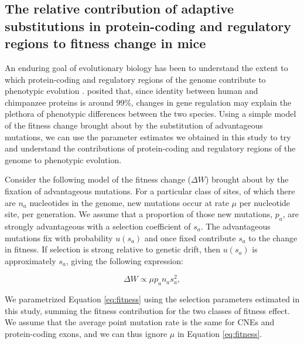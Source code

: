 {\subsection{The relative contribution of adaptive substitutions in protein-coding and regulatory regions to fitness change in mice}

	An enduring goal of evolutionary biology has been to understand the extent to which protein-coding and regulatory regions of the genome contribute to phenotypic evolution \citep{RN347, RN346}. \cite{RN347} posited that, since identity between human and chimpanzee proteins is around 99\%, changes in gene regulation may explain the plethora of phenotypic differences between the two species. Using a simple model of the fitness change brought about by the substitution of advantageous mutations, we can use the parameter estimates we obtained in this study to try and understand the contributions of protein-coding and regulatory regions of the genome to phenotypic evolution.

	Consider the following model of the fitness change ($\Delta W$) brought about by the fixation of advantageous mutations. For a particular class of sites, of which there are $n_a$ nucleotides in the genome, new mutations occur at rate $\mu$ per nucleotide site, per generation. We assume that a proportion of those new mutations, $p_a$, are strongly advantageous with a selection coefficient of $s_a$. The advantageous mutations fix with probability $u(s_a)$ and once fixed contribute $s_a$ to the change in fitness. If selection is strong relative to genetic drift, then $u(s_a)$ is approximately $s_a$, giving the following expression:

		\begin{equation}
		\label{eq:fitness}
		\Delta W \propto \mu p_a n_a s_a^2,
		\end{equation}

	We parametrized Equation \ref{eq:fitness} using the selection parameters estimated in this study, summing the fitness contribution for the two classes of fitness effect. We assume that the average point mutation rate is the same for CNEs and protein-coding exons, and we can thus ignore $\mu$ in Equation \ref{eq:fitness}. 
 
}
